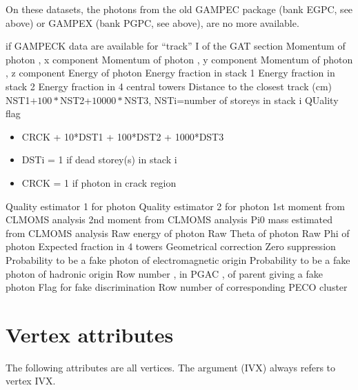  On these datasets, the photons from the old GAMPEC package (bank EGPC, see above) or GAMPEX (bank PGPC, see above),
 are no more available.
\par
\begin{indentlist}{ 3.00cm}{ 3.25cm}
 if GAMPECK data are available for ``track'' I of the GAT section
Momentum of photon , x component
Momentum of photon , y component
Momentum of photon , z component
Energy  of photon
Energy fraction in stack 1
Energy fraction in stack 2
Energy fraction in 4 central towers
Distance to the closest track (cm)
 NST1$+100*$NST2+$10000*$NST3, NSTi=number of storeys in stack i
 QUality flag
\begin{itemize}
\item CRCK + 10*DST1 + 100*DST2 + 1000*DST3
\item DSTi = 1 if dead storey(s) in stack i
\item CRCK = 1 if photon in crack region
\end{itemize}
Quality estimator 1 for photon
Quality estimator 2 for photon
1st moment from CLMOMS analysis
2nd moment from CLMOMS analysis
Pi0 mass estimated from CLMOMS analysis
Raw energy of photon
Raw Theta  of photon
Raw Phi    of photon
Expected fraction in 4 towers
Geometrical correction
Zero suppression
Probability to be a fake photon of electromagnetic origin
Probability to be a fake photon of hadronic origin
Row number , in PGAC , of parent giving a fake photon
Flag for fake discrimination
Row number of corresponding PECO cluster
\end{indentlist}
 
\section{\label{sec-TVAVA}Vertex attributes}
\par
The following attributes are
all vertices.
The argument (IVX) always refers to vertex IVX.
\par
 
